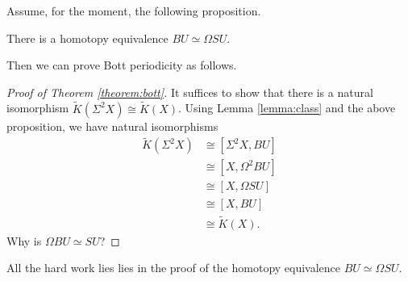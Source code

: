 \documentclass{amsart}
\begin{document}
Assume, for the moment, the following proposition.
\begin{proposition}
    There is a homotopy equivalence $BU\simeq\Omega SU$.
    \label{proposition:may}
\end{proposition}

Then we can prove Bott periodicity as follows.
\begin{proof}[Proof of Theorem \ref{theorem:bott}]
    It suffices to show that there is a natural isomorphism $\tilde K(\Sigma^2X)\cong\tilde K(X)$.
    Using Lemma \ref{lemma:class} and the above proposition, we have natural isomorphisms 
    \begin{align*}
        \tilde K(\Sigma^2X) &\cong [\Sigma^2X,BU]\\
        &\cong [X, \Omega^2BU]\\
        &\cong [X,\Omega SU]\\
        &\cong [X, BU]\\
        &\cong \tilde K(X).
    \end{align*}
    {\color{red} Why is $\Omega BU\simeq SU$?}
\end{proof}

All the hard work lies lies in the proof of the homotopy equivalence $BU\simeq\Omega SU$.
\end{document}
